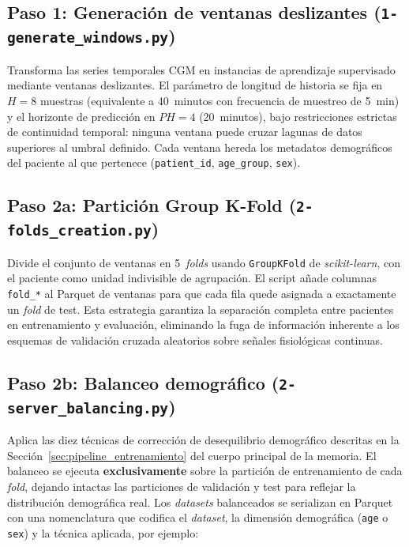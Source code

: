 \subsection{Paso 1: Generación de ventanas deslizantes
            (\texttt{1-generate\_windows.py})}
\label{subsec:anexo_ventanas}

Transforma las series temporales CGM en instancias de aprendizaje
supervisado mediante ventanas deslizantes. El parámetro de longitud de
historia se fija en $H=8$ muestras (equivalente a 40~minutos con
frecuencia de muestreo de 5~min) y el horizonte de predicción en
$PH=4$ (20~minutos), bajo restricciones estrictas de continuidad
temporal: ninguna ventana puede cruzar lagunas de datos superiores al
umbral definido. Cada ventana hereda los metadatos demográficos del
paciente al que pertenece (\texttt{patient\_id}, \texttt{age\_group},
\texttt{sex}).

\subsection{Paso 2a: Partición Group K-Fold
            (\texttt{2-folds\_creation.py})}
\label{subsec:anexo_folds}

Divide el conjunto de ventanas en 5~\textit{folds} usando
\texttt{GroupKFold} de \textit{scikit-learn}, con el paciente como
unidad indivisible de agrupación. El script añade columnas
\texttt{fold\_*} al Parquet de ventanas para que cada fila quede
asignada a exactamente un \textit{fold} de test. Esta estrategia
garantiza la separación completa entre pacientes en entrenamiento y
evaluación, eliminando la fuga de información inherente a los esquemas
de validación cruzada aleatorios sobre señales fisiológicas continuas.

\subsection{Paso 2b: Balanceo demográfico
            (\texttt{2-server\_balancing.py})}
\label{subsec:anexo_balanceo}

Aplica las diez técnicas de corrección de desequilibrio demográfico
descritas en la Sección~\ref{sec:pipeline_entrenamiento} del cuerpo
principal de la memoria. El balanceo se ejecuta \textbf{exclusivamente}
sobre la partición de entrenamiento de cada \textit{fold}, dejando
intactas las particiones de validación y test para reflejar la
distribución demográfica real. Los \textit{datasets} balanceados se
serializan en Parquet con una nomenclatura que codifica el
\textit{dataset}, la dimensión demográfica (\texttt{age} o \texttt{sex})
y la técnica aplicada, por ejemplo:

